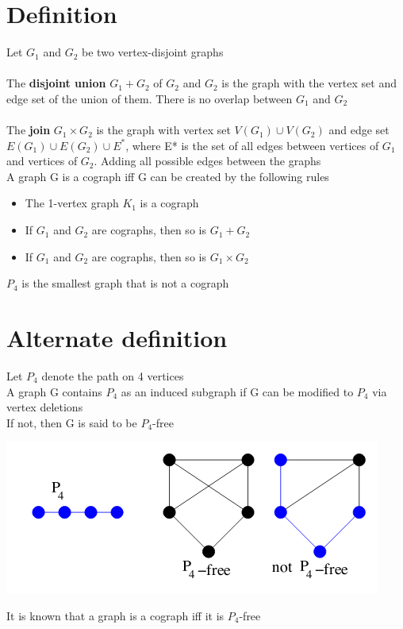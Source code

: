 \documentclass{article}[18pt]
\begin{document}
\section{Definition}
Let $G_1$ and $G_2$ be two vertex-disjoint graphs\\
\\
The \textbf{disjoint union} $G_1+G_2$ of $G_2$ and $G_2$ is the graph with the vertex set and edge set of the union of them. There is no overlap between $G_1$ and $G_2$\\
\\
The \textbf{join} $G_1\times G_2$ is the graph with vertex set $V(G_1)\cup V(G_2)$ and edge set $E(G_1)\cup E(G_2)\cup E^*$, where E* is the set of all edges between vertices of $G_1$ and vertices of $G_2$. Adding all possible edges between the graphs\\
A graph G is a cograph iff G can be created by the following rules
\begin{itemize}
	\item The 1-vertex graph $K_1$ is a cograph
	\item If $G_1$ and $G_2$ are cographs, then so is $G_1+G_2$
	\item If $G_1$ and $G_2$ are cographs, then so is $G_1\times G_2$
\end{itemize}
\begin{important}[Cographs]
	$P_4$ is the smallest graph that is not a cograph
\end{important}
\section{Alternate definition}
Let $P_4$ denote the path on 4 vertices\\
A graph G contains $P_4$ as an induced subgraph if G can be modified to $P_4$ via vertex deletions\\
If not, then G is said to be $P_4$-free
\begin{center}
	\includegraphics[scale=0.7]{p4}
\end{center}
It is known that a graph is a cograph iff it is $P_4$-free
\end{document}
